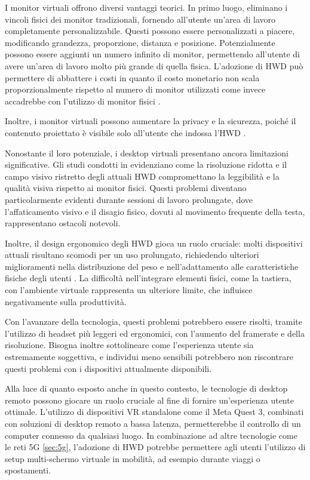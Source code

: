 \documentclass[12pt,a4paper,openright,twoside]{book}
\begin{document}
I monitor virtuali offrono diversi vantaggi teorici. In primo luogo, eliminano i vincoli fisici dei monitor tradizionali, fornendo all'utente un'area di lavoro completamente personalizzabile. Questi possono essere personalizzati a piacere, modificando grandezza, proporzione, distanza e posizione. Potenzialmente possono essere aggiunti un numero infinito di monitor, permettendo all'utente di avere un'area di lavoro molto più grande di quella fisica.
L'adozione di HWD può permettere di abbattere i costi in quanto il costo monetario non scala proporzionalmente rispetto al numero di monitor utilizzati come invece accadrebbe con l'utilizzo di monitor fisici \cite{frontiers2023}.

Inoltre, i monitor virtuali possono aumentare la privacy e la sicurezza, poiché il contenuto proiettato è visibile solo all'utente che indossa l'HWD \cite{pavanatto2021}.

Nonostante il loro potenziale, i desktop virtuali presentano ancora limitazioni significative. Gli studi condotti in \cite{pavanatto2021, frontiers2023} evidenziano come la risoluzione ridotta e il campo visivo ristretto degli attuali HWD compromettano la leggibilità e la qualità visiva rispetto ai monitor fisici. Questi problemi diventano particolarmente evidenti durante sessioni di lavoro prolungate, dove l'affaticamento visivo e il disagio fisico, dovuti al movimento frequente della testa, rappresentano ostacoli notevoli.

Inoltre, il design ergonomico degli HWD gioca un ruolo cruciale: molti dispositivi attuali risultano scomodi per un uso prolungato, richiedendo ulteriori miglioramenti nella distribuzione del peso e nell'adattamento alle caratteristiche fisiche degli utenti \cite{frontiers2023}. La difficoltà nell'integrare elementi fisici, come la tastiera, con l'ambiente virtuale rappresenta un ulteriore limite, che influisce negativamente sulla produttività.

Con l'avanzare della tecnologia, questi problemi potrebbero essere risolti, tramite l'utilizzo di headset più leggeri ed ergonomici, con l'aumento del framerate e della risoluzione. Bisogna inoltre sottolineare come l'esperienza utente sia estremamente soggettiva, e individui meno sensibili potrebbero non riscontrare questi problemi con i dispositivi attualmente disponibili.

Alla luce di quanto esposto anche in questo contesto, le tecnologie di desktop remoto possono giocare un ruolo cruciale al fine di fornire un'esperienza utente ottimale. L'utilizzo di dispositivi VR standalone come il Meta Quest 3, combinati con soluzioni di desktop remoto a bassa latenza, permetterebbe il controllo di un computer connesso da qualsiasi luogo. In combinazione ad altre tecnologie come le reti 5G \ref{sec:5g}, l'adozione di HWD potrebbe permettere agli utenti l'utilizzo di setup multi-schermo virtuale in mobilità, ad esempio durante viaggi o spostamenti.
\end{document}
